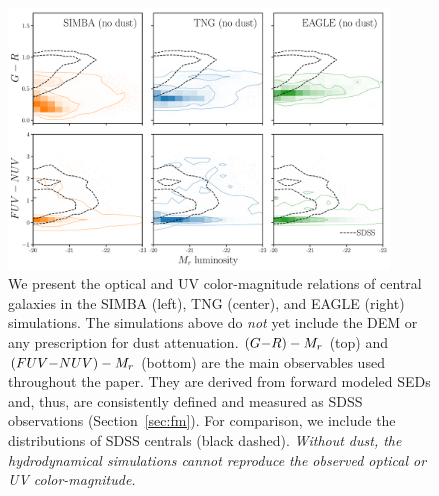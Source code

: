 \begin{figure}
\begin{center}
\includegraphics[width=0.9\textwidth]{figs/observables.pdf} 
    \caption{\label{fig:obs}
    We present the optical and UV color-magnitude relations of central galaxies
    in the SIMBA (left), TNG (center), and EAGLE (right) simulations. The
    simulations above do {\em not} yet include the DEM or any prescription for
    dust attenuation.  $(G{-}R)-M_r$ (top) and $(FUV{-}NUV)-M_r$ (bottom) are the
    main observables used throughout the paper. They are derived from forward
    modeled SEDs and, thus, are consistently defined and measured as SDSS
    observations (Section~\ref{sec:fm}). For comparison, we include the 
    distributions of SDSS centrals (black dashed). {\em Without dust, the 
    hydrodynamical simulations cannot reproduce the observed optical or UV 
    color-magnitude.}
    }
\end{center}
\end{figure}
